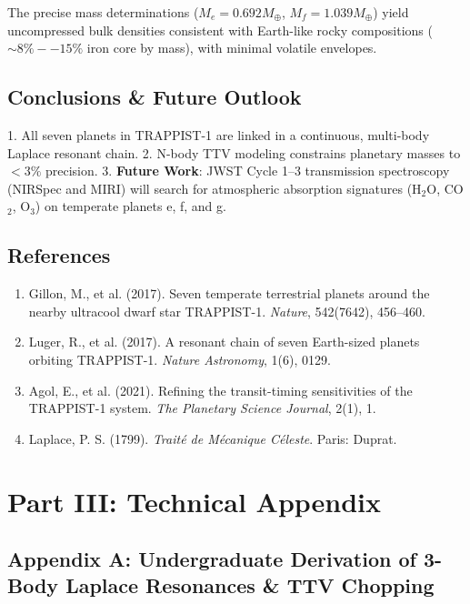 \documentclass[11pt,a4paper]{article}
\begin{document}
The precise mass determinations ($M_e = 0.692 M_\oplus$, $M_f = 1.039 M_\oplus$) yield uncompressed bulk densities consistent with Earth-like rocky compositions ($\sim 8\%--15\%$ iron core by mass), with minimal volatile envelopes.

\subsection{Conclusions \& Future Outlook}
1. All seven planets in TRAPPIST-1 are linked in a continuous, multi-body Laplace resonant chain.
2. N-body TTV modeling constrains planetary masses to $<3\%$ precision.
3. \textbf{Future Work}: JWST Cycle 1--3 transmission spectroscopy (NIRSpec and MIRI) will search for atmospheric absorption signatures (H$_2$O, CO$_2$, O$_3$) on temperate planets e, f, and g.

\subsection*{References}
\begin{enumerate}
    \item Gillon, M., et al. (2017). Seven temperate terrestrial planets around the nearby ultracool dwarf star TRAPPIST-1. \textit{Nature}, 542(7642), 456--460.
    \item Luger, R., et al. (2017). A resonant chain of seven Earth-sized planets orbiting TRAPPIST-1. \textit{Nature Astronomy}, 1(6), 0129.
    \item Agol, E., et al. (2021). Refining the transit-timing sensitivities of the TRAPPIST-1 system. \textit{The Planetary Science Journal}, 2(1), 1.
    \item Laplace, P. S. (1799). \textit{Traité de Mécanique Céleste}. Paris: Duprat.
\end{enumerate}

\newpage

\section*{Part III: Technical Appendix}

\subsection*{Appendix A: Undergraduate Derivation of 3-Body Laplace Resonances \& TTV Chopping}
\end{document}
